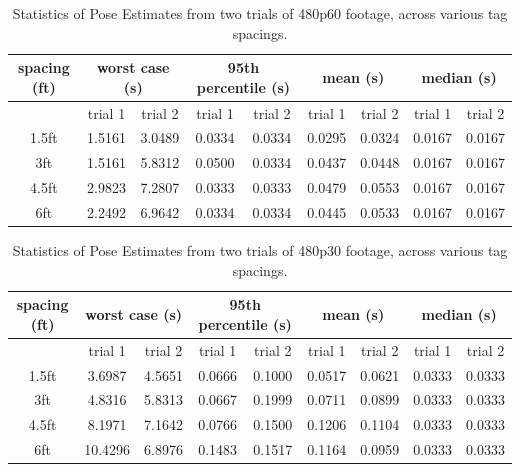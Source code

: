 \documentclass{article}
\begin{document}
    \begin{table}[H]
      \centering
      \begin{tabular}{|c|c|c|c|c|c|c|c|c|} \hline
        spacing (ft) & \multicolumn{2}{c}{worst case (s)} & \multicolumn{2}{c}{95th percentile (s)} & \multicolumn{2}{c}{mean (s)} & \multicolumn{2}{c|}{median (s)} \\ \hline
            & trial 1 & trial 2 & trial 1 & trial 2 & trial 1 & trial 2 & trial 1 & trial 2 \\ \hline
        1.5ft & 1.5161 & 3.0489 & 0.0334 & 0.0334 & 0.0295 & 0.0324 & 0.0167 & 0.0167 \\ \hline
        3ft   & 1.5161 & 5.8312 & 0.0500 & 0.0334 & 0.0437 & 0.0448 & 0.0167 & 0.0167 \\ \hline
        4.5ft & 2.9823 & 7.2807 & 0.0333 & 0.0333 & 0.0479 & 0.0553 & 0.0167 & 0.0167 \\ \hline
        6ft   & 2.2492 & 6.9642 & 0.0334 & 0.0334 & 0.0445 & 0.0533 & 0.0167 & 0.0167 \\ \hline
      \end{tabular}
      \caption{Statistics of Pose Estimates from two trials of 480p60 footage, across various tag spacings.}
      \label{table:480p60_pose_estimate_stats}
    \end{table}

    \begin{table}[H]
      \centering
      \begin{tabular}{|c|c|c|c|c|c|c|c|c|} \hline
        spacing (ft) & \multicolumn{2}{c}{worst case (s)} & \multicolumn{2}{c}{95th percentile (s)} & \multicolumn{2}{c}{mean (s)} & \multicolumn{2}{c|}{median (s)} \\ \hline
            & trial 1 & trial 2 & trial 1 & trial 2 & trial 1 & trial 2 & trial 1 & trial 2 \\ \hline
        1.5ft & 3.6987 & 4.5651 & 0.0666 & 0.1000 & 0.0517 & 0.0621 & 0.0333 & 0.0333 \\ \hline
        3ft   & 4.8316 & 5.8313 & 0.0667 & 0.1999 & 0.0711 & 0.0899 & 0.0333 & 0.0333 \\ \hline
        4.5ft & 8.1971 & 7.1642 & 0.0766 & 0.1500 & 0.1206 & 0.1104 & 0.0333 & 0.0333 \\ \hline
        6ft   & 10.4296 & 6.8976 & 0.1483 & 0.1517 & 0.1164 & 0.0959 & 0.0333 & 0.0333 \\ \hline
      \end{tabular}
      \caption{Statistics of Pose Estimates from two trials of 480p30 footage, across various tag spacings.}
      \label{table:480p30_pose_estimate_stats}
    \end{table}
\end{document}
